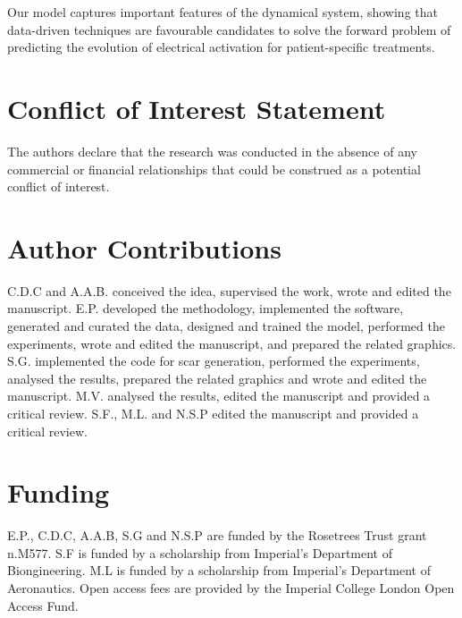 \documentclass[utf8]{frontiersSCNS} %
\begin{document}
Our model captures important features of the dynamical system, showing that data-driven techniques are favourable candidates to solve the forward problem of predicting the evolution of electrical activation for patient-specific treatments.

\section*{Conflict of Interest Statement}
The authors declare that the research was conducted in the absence of any commercial or financial relationships that could be construed as a potential conflict of interest.

\section*{Author Contributions}
C.D.C and A.A.B. conceived the idea, supervised the work, wrote and edited the manuscript.
E.P. developed the methodology, implemented the software, generated and curated the data, designed and trained the model, performed the experiments, wrote and edited the manuscript, and prepared the related graphics.
S.G. implemented the code for scar generation, performed the experiments, analysed the results, prepared the related graphics and wrote and edited the manuscript.
M.V. analysed the results, edited the manuscript and provided a critical review. S.F., M.L. and N.S.P edited the manuscript and provided a critical review.

\section*{Funding}
E.P., C.D.C, A.A.B, S.G and N.S.P are funded by the Rosetrees Trust grant n.M577.
S.F is funded by a scholarship from Imperial's Department of Biongineering. M.L is funded by a scholarship from Imperial's Department of Aeronautics. 
Open access fees are provided by the Imperial College London Open Access Fund.

\end{document}

